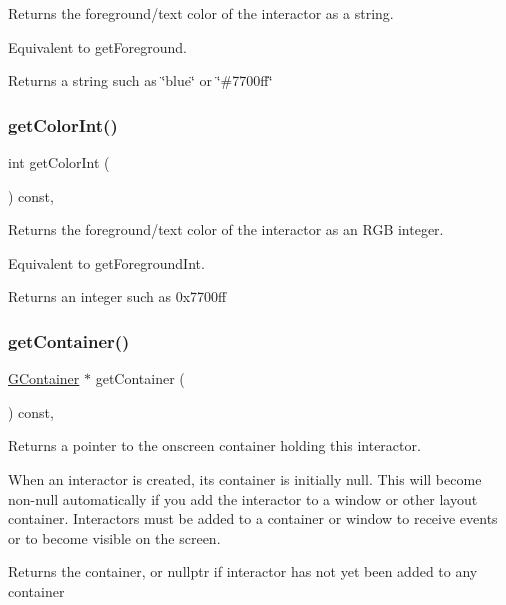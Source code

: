 Returns the foreground/text color of the interactor as a string. 

Equivalent to get\+Foreground. \begin{DoxyReturn}{Returns}
a string such as \char`\"{}blue\char`\"{} or \char`\"{}\#7700ff\char`\"{} 
\end{DoxyReturn}
\mbox{\label{classGInteractor_a9635c7af766cdc3417f346683fa0e6c1}} 
\subsubsection{\texorpdfstring{get\+Color\+Int()}{getColorInt()}}
{\footnotesize\ttfamily int get\+Color\+Int (\begin{DoxyParamCaption}{ }\end{DoxyParamCaption}) const\hspace{0.3cm}{\ttfamily [virtual]}, {\ttfamily [inherited]}}



Returns the foreground/text color of the interactor as an R\+GB integer. 

Equivalent to get\+Foreground\+Int. \begin{DoxyReturn}{Returns}
an integer such as 0x7700ff 
\end{DoxyReturn}
\mbox{\label{classGInteractor_a7a6e317c29d61030929b4cd2d1c00fe7}} 
\subsubsection{\texorpdfstring{get\+Container()}{getContainer()}}
{\footnotesize\ttfamily \mbox{\hyperlink{classGContainer}{G\+Container}} $\ast$ get\+Container (\begin{DoxyParamCaption}{ }\end{DoxyParamCaption}) const\hspace{0.3cm}{\ttfamily [virtual]}, {\ttfamily [inherited]}}



Returns a pointer to the onscreen container holding this interactor. 

When an interactor is created, its container is initially null. This will become non-\/null automatically if you add the interactor to a window or other layout container. Interactors must be added to a container or window to receive events or to become visible on the screen. \begin{DoxyReturn}{Returns}
the container, or nullptr if interactor has not yet been added to any container 
\end{DoxyReturn}
\mbox{\label{classGInteractor_a894a5502900794eeb27d084c21f1d77d}} 
